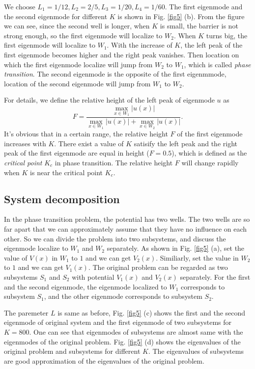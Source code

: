 \documentclass[a4paper,11pt]{article}
\begin{document}
We choose $L_1 = 1/12, L_2 = 2/5, L_3= 1/20, L_4 = 1/60$. The first eigenmode and the second eigenmode for different $K$ is shown in Fig. \ref{fig5} (b). From the figure we can see, since the second well is longer, when $K$ is small, the barrier is not strong enough, so the first eigenmode will localize to $W_2$. When $K$ turns big, the first eigenmode will localize to $W_1$. With the increase of $K$, the left peak of the first eigenmode becomes higher and the right peak vanishes. Then location on which the first eigenmode localize will jump from $W_2$ to $W_1$, which is called \emph{phase transition}. The second eigenmode is the opposite of the first eigenmmode, location of the second eigenmode will jump from $W_1$ to $W_2$.

For details, we define the relative height of the left peak of eigenmode $u$ as 
\begin{equation}
F = \frac{\max_{x \in W_1} |u(x)|}{\max_{x \in W_1} |u(x)| + \max_{x \in W_2} |u(x)|}.
\end{equation}
It's obvious that in a certain range, the relative height $F$ of the first eigenmode increases with $K$. There exist a value of $K$ satisify the left peak and the right peak of the first eigenmode are equal in height ($F = 0.5$), which is defined as the \emph{critical point} $K_c$ in phase transition. The relative height $F$ will change rapidly when $K$ is near the critical point $K_c$.

\subsection{System decomposition}

In the phase transition problem, the potential has two wells. The two wells are so far apart that we can approximately assume that they have no influence on each other. So we can divide the problem into two subsystems, and discuss the eigenmode localize to $W_1$ and $W_2$ separately. As shown in Fig. \ref{fig5} (a), set the value of $V(x)$ in $W_1$ to $1$ and we can get $V_2(x)$. Similiarly, set the value in $W_2$ to $1$ and we can get $V_1(x)$. The original problem can be regarded as two subsystems $S_1$ and $S_2$ with potential $V_1(x)$ and $V_2(x)$ separately. For the first and the second eigenmode, the eigenmode localized to $W_1$ corresponds to subsystem $S_1$, and the other eigenmode corresponds to subsystem $S_2$. 

The paremeter $L$ is same as before, Fig. \ref{fig5} (c) shows the first and the second eigenmode of original system and the first eigenmode of two subsystems for $K = 800$. One can see that eigenmodes of subsystems are almost same with the eigenmodes of the original problem. Fig. \ref{fig5} (d) shows the eigenvalues of the original problem and subsystems for different $K$. The eigenvalues of subsystems are good approximation of the eigenvalues of the original problem.
\end{document}
